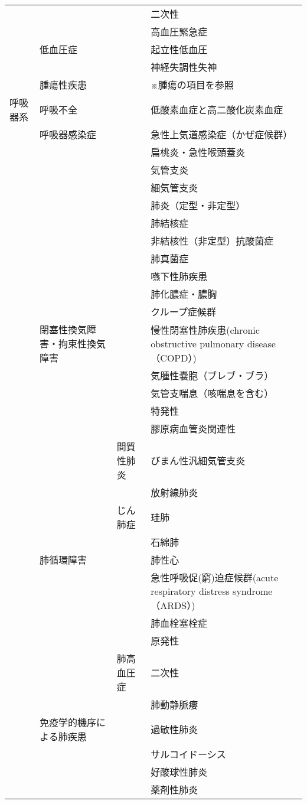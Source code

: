 \begin{xltabular}{\linewidth}{XXXX}
 &  &  & 二次性 \\
 &  &  & 高血圧緊急症 \\
 & 低血圧症 &  & 起立性低血圧 \\
 &  &  & 神経失調性失神 \\
 & 腫瘍性疾患 &  & ※腫瘍の項目を参照 \\
呼吸器系 & 呼吸不全 &  & 低酸素血症と高二酸化炭素血症 \\
 & 呼吸器感染症 &  & 急性上気道感染症（かぜ症候群） \\
 &  &  & 扁桃炎・急性喉頭蓋炎 \\
 &  &  & 気管支炎 \\
 &  &  & 細気管支炎 \\
 &  &  & 肺炎（定型・非定型） \\
 &  &  & 肺結核症 \\
 &  &  & 非結核性（非定型）抗酸菌症 \\
 &  &  & 肺真菌症 \\
 &  &  & 嚥下性肺疾患 \\
 &  &  & 肺化膿症・膿胸 \\
 &  &  & クループ症候群 \\
 & 閉塞性換気障害・拘束性換気障害 &  & 慢性閉塞性肺疾患(chronic obstructive pulmonary disease （COPD）) \\
 &  &  & 気腫性嚢胞（ブレブ・ブラ） \\
 &  &  & 気管支喘息（咳喘息を含む） \\
 &  &  & 特発性 \\
 &  &  & 膠原病血管炎関連性 \\
 &  & 間質性肺炎 & びまん性汎細気管支炎 \\
 &  &  & 放射線肺炎 \\
 &  & じん肺症 & 珪肺 \\
 &  &  & 石綿肺 \\
 & 肺循環障害 &  & 肺性心 \\
 &  &  & 急性呼吸促(窮)迫症候群(acute respiratory distress syndrome （ARDS）) \\
 &  &  & 肺血栓塞栓症 \\
 &  &  & 原発性 \\
 &  & 肺高血圧症 & 二次性 \\
 &  &  & 肺動静脈瘻 \\
 & 免疫学的機序による肺疾患 &  & 過敏性肺炎 \\
 &  &  & サルコイドーシス \\
 &  &  & 好酸球性肺炎 \\
 &  &  & 薬剤性肺炎 \\

\end{xltabular}
